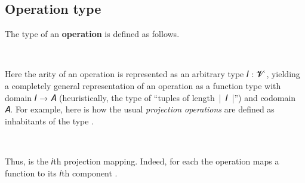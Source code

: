 \documentclass[a4paper,USenglish,cleveref,autoref,thm-restate]{lipics-v2019}
\begin{document}
\subsection{Operation type}
The type of an \textbf{operation} is defined as follows.
\begin{code}%
\>[0]\AgdaSpace{}%
\AgdaSymbol{:}\AgdaSpace{}%
\AgdaSpace{}%
\AgdaSpace{}%
\AgdaSpace{}%
\AgdaSpace{}%
\AgdaSpace{}%
\AgdaSpace{}%
\AgdaSpace{}%
\AgdaSpace{}%
\AgdaSpace{}%
\<%
\\
\>[0]\AgdaSpace{}%
\AgdaSpace{}%
\AgdaSpace{}%
\AgdaSymbol{=}\AgdaSpace{}%
\AgdaSymbol{(}\AgdaSpace{}%
\AgdaSpace{}%
\AgdaSymbol{)}\AgdaSpace{}%
\AgdaSpace{}%
\<%
\end{code}
Here the arity of an operation is represented as an arbitrary type \ab 𝐼 : \ab 𝓥 ̇, yielding a completely general representation of an operation as a function type with domain \ab 𝐼 → \ab 𝐴 (heuristically, the type of ``tuples of length~|~\ab 𝐼~|'') and codomain \ab 𝐴. For example, here is how the usual \emph{projection operations} are defined as inhabitants of the type \AgdaSpace{}\AgdaSpace{}.
\begin{code}%
\>[0]\AgdaSpace{}%
\AgdaSymbol{:}\AgdaSpace{}%
\AgdaSymbol{\{}\AgdaSpace{}%
\AgdaSymbol{:}\AgdaSpace{}%
\AgdaSpace{}%
\AgdaSpace{}%
\AgdaSymbol{\}}\AgdaSpace{}%
\AgdaSymbol{\{}\AgdaSpace{}%
\AgdaSymbol{:}\AgdaSpace{}%
\AgdaSpace{}%
\AgdaSpace{}%
\AgdaSymbol{\}}\AgdaSpace{}%
\AgdaSpace{}%
\AgdaSpace{}%
\AgdaSpace{}%
\AgdaSpace{}%
\AgdaSpace{}%
\<%
\\
\>[0]\AgdaSpace{}%
\AgdaSpace{}%
\AgdaSpace{}%
\AgdaSymbol{=}\AgdaSpace{}%
\AgdaSpace{}%
\<%
\end{code}
Thus, \AgdaSpace{} is the 𝑖th projection mapping. Indeed, for each\AgdaSpace{}\AgdaSpace{}\AgdaSymbol{:}\AgdaSpace{}\AgdaSpace{} the operation
\AgdaSpace{}\AgdaSpace{}\AgdaSymbol{:}\AgdaSpace{}\AgdaSpace{}%
\AgdaSpace{}%
 maps a function
\AgdaSpace{}%
\AgdaSymbol{:}\AgdaSpace{}%
\AgdaSpace{}%
\AgdaSpace{}%
to its 𝑖th component \AgdaSpace{}.
\end{document}
